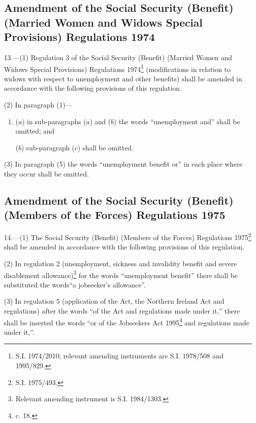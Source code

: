 \documentclass[a4paper]{article}
\begin{document}
\subsection[13. Amendment of the Social Security (Benefit) (Married Women and Widows Special Provisions) Regulations 1974]{Amendment of the Social Security (Benefit) (Married Women and Widows Special Provisions) Regulations 1974}

13.—(1) Regulation 3 of the Social Security (Benefit) (Married Women and Widows Special Provisions) Regulations 1974\footnote{\frenchspacing S.I. 1974/2010; relevant amending instruments are S.I. 1978/508 and 1995/829.} (modifications in relation to widows with respect to unemployment and other benefits) shall be amended in accordance with the following provisions of this regulation.

(2) In paragraph (1)—
\begin{enumerate}\item[]
($a$) in sub-paragraphs ($a$) and ($b$) the words “unemployment and” shall be omitted; and

($b$) sub-paragraph ($c$) shall be omitted.
\end{enumerate}

(3) In paragraph (5) the words “unemployment benefit or” in each place where they occur shall be omitted.

\subsection[14. Amendment of the Social Security (Benefit) (Members of the Forces) Regulations 1975]{Amendment of the Social Security (Benefit) (Members of the Forces) Regulations 1975}

14.—(1) The Social Security (Benefit) (Members of the Forces) Regulations 1975\footnote{\frenchspacing S.I. 1975/493.} shall be amended in accordance with the following provisions of this regulation.

(2) In regulation 2 (unemployment, sickness and invalidity benefit and severe disablement allowance)\footnote{\frenchspacing Relevant amending instrument is S.I. 1984/1303.} for the words “unemployment benefit” there shall be substituted the words“a jobseeker’s allowance”.

(3) In regulation 5 (application of the Act, the Northern Ireland Act and regulations) after the words “of the Act and regulations made under it,” there shall be inserted the words “or of the Jobseekers Act 1995\footnote{ c. 18.} and regulations made under it,”.
\end{document}
